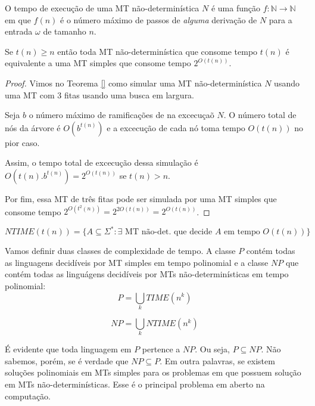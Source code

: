 O tempo de execução de uma MT não-determinística $N$ é uma função $f: \mathbb{N} \to \mathbb{N}$ em que $f(n)$ é o número máximo de passos de {\em alguma} derivação de $N$ para a entrada $\omega$ de tamanho $n$.


\begin{theorem}
  Se $t(n) \geq n$ então toda MT não-determinística que consome tempo $t(n)$ é equivalente a uma MT simples que consome tempo $2^{O(t(n))}$.
\end{theorem}
\begin{proof}
  Vimos no Teorema \ref{} como simular uma MT não-determinística $N$ usando uma MT com 3 fitas usando uma busca em largura.

  Seja $b$ o número máximo de ramificações de na excecuçaõ $N$.
  O número total de nós da árvore é $O(b^{t(n)})$ e a excecução de cada nó toma tempo $O(t(n))$ no pior caso.

  Assim, o tempo total de excecução dessa simulação é $O(t(n).b^{t(n)}) = 2^{O(t(n))}$ se $t(n) > n$.

  Por fim, essa MT de três fitas pode ser simulada por uma MT simples que consome tempo $2^{O(t^2(n))} = 2^{2O(t(n))} = 2^{O(t(n))}$. 
\end{proof}

\begin{displaymath}
  NTIME(t(n)) = \{A \subseteq \Sigma^* : \textrm{$\exists$ MT não-det. que decide $A$ em tempo $O(t(n))$}\}
\end{displaymath}

Vamos definir duas classes de complexidade de tempo.
A classe $P$ contém todas as linguagens decidíveis por MT simples em tempo polinomial e a classe $NP$ que contém todas as linguágens decidíveis por MTs não-determinísticas em tempo polinomial:
\begin{displaymath}
  P = \bigcup_k TIME(n^k)
\end{displaymath}

\begin{displaymath}
  NP = \bigcup_k NTIME(n^k)
\end{displaymath}

É evidente que toda linguagem em $P$ pertence a $NP$.
Ou seja, $P \subseteq NP$.
Não sabemos, porém, se é verdade que $NP \subseteq P$.
Em outra palavras, se existem soluções polinomiais em MTs simples para os problemas em que possuem solução em MTs não-determinísticas.
Esse é o principal problema em aberto na computação.


